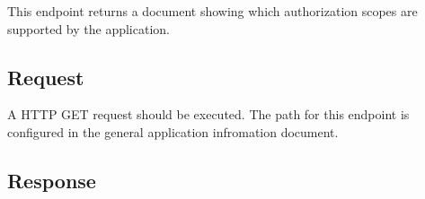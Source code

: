 This endpoint returns a document showing which authorization scopes are supported
by the application.

\subsection{Request}
\label{subsec:request-supported-scopes}

A HTTP GET request should be executed.
The path for this endpoint is configured in the general application infromation document.

\subsection{Response}
\label{subsec:response-supported-scopes}



